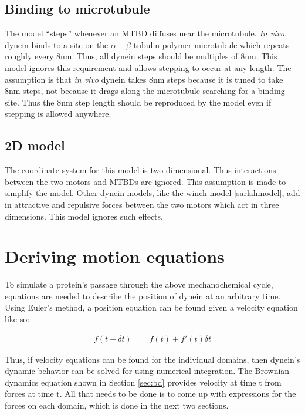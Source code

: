\documentclass[
11pt, %
english, %
singlespacing, %
headsepline, %
chapterinoneline, %
]{MastersDoctoralThesis} %
\begin{document}
\subsection{Binding to microtubule}
The model ``steps'' whenever an MTBD diffuses near the microtubule. \textit{In vivo}, dynein binds to a site on the $\alpha-\beta$ tubulin polymer microtubule which repeats roughly every 8nm. Thus, all dynein steps should be multiples of $8$nm. This model ignores this requirement and allows stepping to occur at any length. The assumption is that \textit{in vivo} dynein takes 8nm steps because it is tuned to take 8nm steps, not because it drags along the microtubule searching for a binding site. Thus the 8nm step length should be reproduced by the model even if stepping is allowed anywhere.\\

\subsection{2D model}
The coordinate system for this model is two-dimensional. Thus interactions between the two motors and MTBDs are ignored. This assumption is made to simplify the model. Other dynein models, like the winch model \ref{sarlahmodel}, add in attractive and repulsive forces between the two motors which act in three dimensions. This model ignores such effects.\\

\section{Deriving motion equations}
To simulate a protein's passage through the above mechanochemical cycle, equations are needed to describe the position of dynein at an arbitrary time. Using Euler's method, a position equation can be found given a velocity equation like so:

\begin{align}
  f(t+\delta t) &= f(t)+f'(t)\delta t
\end{align}

Thus, if velocity equations can be found for the individual domains, then dynein's dynamic behavior can be solved for using numerical integration. The Brownian dynamics equation shown in Section \ref{sec:bd} provides velocity at time t from forces at time t. All that needs to be done is to come up with expressions for the forces on each domain, which is done in the next two sections.\\
\end{document}
